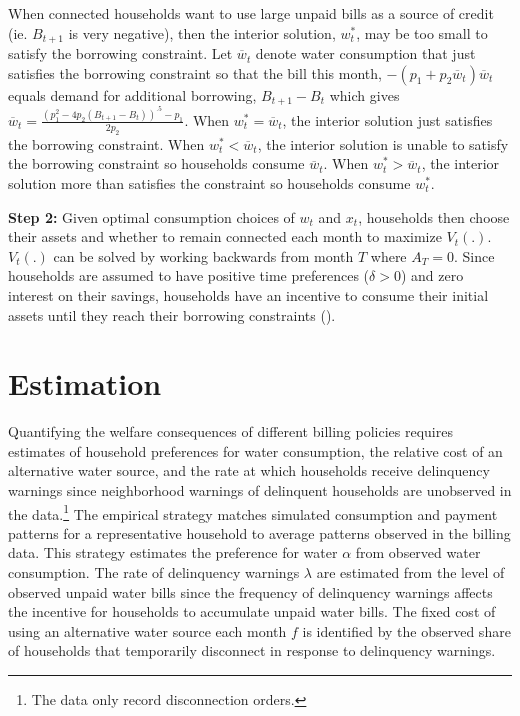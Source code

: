 \documentclass[12pt,table]{article}
\begin{document}
When connected households want to use large unpaid bills as a source of credit (ie. $B_{t+1}$ is very negative), then the  interior solution, $w_t^{*}$, may be too small to satisfy the borrowing constraint.  Let $\overline{w}_t$ denote water consumption that just satisfies the borrowing constraint so that the bill this month, $-(p_1 +p_2\overline{w}_t)\overline{w}_t$ equals demand for additional borrowing, $B_{t+1}-B_{t}$ which gives $\overline{w}_t = \frac{(p_1^2 - 4p_2 (B_{t+1}-B_{t}))^{.5} - p_1}{2 p_2}$.  When $w_t^{*}=\overline{w}_t$, the interior solution just satisfies the borrowing constraint.  When $w_t^{*}<\overline{w}_t$, the interior solution is unable to satisfy the borrowing constraint so households consume $\overline{w}_t$.  When $w_t^{*}>\overline{w}_t$, the  interior solution more than satisfies the constraint so households consume $w_t^{*}$.

\textbf{Step 2:}  Given optimal consumption choices of $w_t$ and $x_t$, households then choose their assets and whether to remain connected each month to maximize $V_t(.)$.  $V_t(.)$ can be solved by working backwards from month $T$ where $A_T = 0$.  Since households are assumed to have positive time preferences ($\delta>0$) and zero interest on their savings, households have an incentive to consume their initial assets until they reach their borrowing constraints (\cite{deaton1991saving}).  






\section{Estimation}\label{section:estimation}    %



Quantifying the welfare consequences of different billing policies requires estimates of household preferences for water consumption, the relative cost of an alternative water source, and the rate at which households receive delinquency warnings since neighborhood warnings of delinquent households are unobserved in the data.\footnote{The data only record disconnection orders.}  The empirical strategy matches simulated consumption and payment patterns for a representative household to average patterns observed in the billing data.  This strategy estimates the preference for water $\alpha$ from observed water consumption.  The rate of delinquency warnings $\lambda$ are estimated from the level of observed unpaid water bills since the frequency of delinquency warnings affects the incentive for households to accumulate unpaid water bills.  The fixed cost of using an alternative water source each month $f$ is identified by the observed share of households that temporarily disconnect in response to delinquency warnings.  
\end{document}
